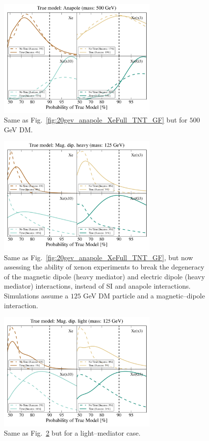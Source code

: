 \documentclass[11pt]{article}
\newcommand{\Fig}[1]{Fig.~\ref{#1}} \newcommand{\Figs}[2]{Figs.~\ref{#1} and \ref{#2}}
\begin{document}
\begin{figure}
\centering
\includegraphics[width=0.7\textwidth]{plots/PDF_500GeV_Anapole_50sims_Xe_Xe3x_Xe10x_XeG3_GF_TNT.pdf}
\caption{\label{fig:500gev_anapole_XeFull_TNT_GF}
Same as Fig.~\ref{fig:20gev_anapole_XeFull_TNT_GF} but for $500$ GeV DM.}
\end{figure}
\begin{figure}
\centering
\includegraphics[width=0.7\textwidth]{plots/PDF_125GeV_Magdipheavy_50sims_Xe_Xe3x_Xe10x_XeG3_GF_TNT.pdf}
\caption{\label{fig:125gev_Mag.dip.heavy_XeFull_TNT_GF}
Same as Fig.~\ref{fig:20gev_anapole_XeFull_TNT_GF}, but now assessing the ability of xenon experiments to break the degeneracy of the magnetic dipole (heavy mediator) and electric dipole (heavy mediator) interactions, instead of SI and anapole interactions. Simulations assume a $125$ GeV DM particle and a magnetic--dipole interaction.}
\end{figure}
\begin{figure}
\centering
\includegraphics[width=0.7\textwidth]{plots/PDF_125GeV_Magdiplight_50sims_Xe_Xe3x_Xe10x_XeG3_GF_TNT.pdf}
\caption{\label{fig:125gev_Mag.dip.light_XeFull_TNT_GF}
Same as \Fig{fig:125gev_Mag.dip.heavy_XeFull_TNT_GF} but for a light--mediator case. }
\end{figure}
\end{document}
